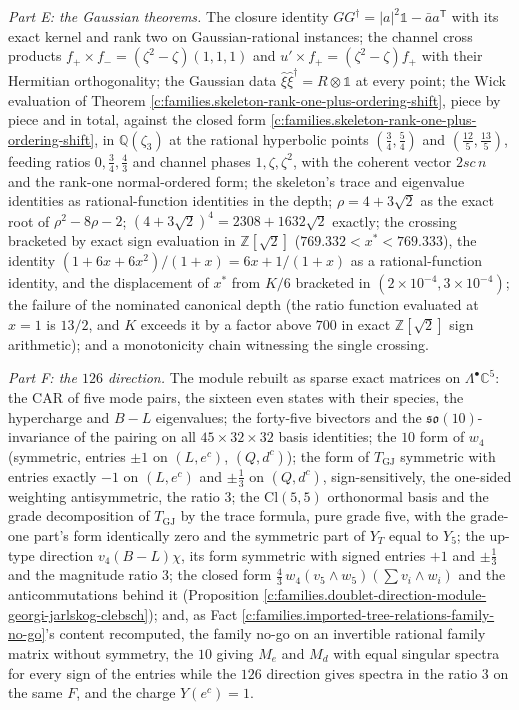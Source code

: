 \documentclass[11pt]{article}
\theoremstyle{definition}
\theoremstyle{plain}
\providecommand{\C}{}\renewcommand{\C}{\mathbb{C}}
\providecommand{\Cl}{}\renewcommand{\Cl}{\mathrm{Cl}}
\providecommand{\so}{}\renewcommand{\so}{\mathfrak{so}}
\begin{document}
\emph{Part E: the Gaussian theorems.} The closure identity $GG^{\dagger} = |a|^{2}\mathbb{1} - \bar{a}a^{\mathsf{T}}$ with its exact kernel and rank two on Gaussian-rational instances; the channel cross products $f_{+} \times f_{-} = (\zeta^{2} - \zeta)(1,1,1)$ and $u' \times f_{+} = (\zeta^{2} - \zeta)f_{+}$ with their Hermitian orthogonality; the Gaussian data $\hat\xi\hat\xi^{\dagger} = R \otimes \mathbb{1}$ at every point; the Wick evaluation of Theorem \ref{c:families.skeleton-rank-one-plus-ordering-shift}, piece by piece and in total, against the closed form \ref{c:families.skeleton-rank-one-plus-ordering-shift}, in $\mathbb{Q}(\zeta_{3})$ at the rational hyperbolic points $(\tfrac34, \tfrac54)$ and $(\tfrac{12}{5}, \tfrac{13}{5})$, feeding ratios $0, \tfrac34, \tfrac43$ and channel phases $1, \zeta, \zeta^{2}$, with the coherent vector $2sc\,n$ and the rank-one normal-ordered form; the skeleton's trace and eigenvalue identities as rational-function identities in the depth; $\rho = 4 + 3\sqrt{2}$ as the exact root of $\rho^{2} - 8\rho - 2$; $(4+3\sqrt{2})^{4} = 2308 + 1632\sqrt{2}$ exactly; the crossing bracketed by exact sign evaluation in $\mathbb{Z}[\sqrt{2}]$ ($769.332 < x^{*} < 769.333$), the identity $(1+6x+6x^{2})/(1+x) = 6x + 1/(1+x)$ as a rational-function identity, and the displacement of $x^{*}$ from $K/6$ bracketed in $(2 \times 10^{-4}, 3 \times 10^{-4})$; the failure of the nominated canonical depth (the ratio function evaluated at $x = 1$ is $13/2$, and $K$ exceeds it by a factor above $700$ in exact $\mathbb{Z}[\sqrt{2}]$ sign arithmetic); and a monotonicity chain witnessing the single crossing.

\emph{Part F: the $126$ direction.} The module rebuilt as sparse exact matrices on $\Lambda^{\bullet}\C^{5}$: the CAR of five mode pairs, the sixteen even states with their species, the hypercharge and $B - L$ eigenvalues; the forty-five bivectors and the $\so(10)$-invariance of the pairing on all $45 \times 32 \times 32$ basis identities; the $10$ form of $w_{4}$ (symmetric, entries $\pm 1$ on $(L, e^{c})$, $(Q, d^{c})$); the form of $T_{\mathrm{GJ}}$ symmetric with entries exactly $-1$ on $(L, e^{c})$ and $\pm\tfrac13$ on $(Q, d^{c})$, sign-sensitively, the one-sided weighting antisymmetric, the ratio $3$; the $\Cl(5,5)$ orthonormal basis and the grade decomposition of $T_{\mathrm{GJ}}$ by the trace formula, pure grade five, with the grade-one part's form identically zero and the symmetric part of $Y_{T}$ equal to $Y_{5}$; the up-type direction $v_{4}(B - L)\chi$, its form symmetric with signed entries $+1$ and $\pm\tfrac13$ and the magnitude ratio $3$; the closed form $\tfrac43\,w_{4}(v_{5} \wedge w_{5})(\sum v_{i} \wedge w_{i})$ and the anticommutations behind it (Proposition \ref{c:families.doublet-direction-module-georgi-jarlskog-clebsch}); and, as Fact \ref{c:families.imported-tree-relations-family-no-go}'s content recomputed, the family no-go on an invertible rational family matrix without symmetry, the $10$ giving $M_{e}$ and $M_{d}$ with equal singular spectra for every sign of the entries while the $126$ direction gives spectra in the ratio $3$ on the same $F$, and the charge $Y(e^{c}) = 1$.
\end{document}
